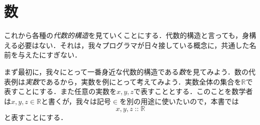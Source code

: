 \documentclass[twocolumn]{jsbook}
\newcommand{\keyword}[1]{{\emph{#1}}}
\DeclareMathOperator{\mathIn}{::}
\newcommand{\mathSpecialSet}[1]{\mathbb{#1}}
\begin{document}
\section{数}

これから各種の\keyword{代数的構造}を見ていくことにする．代数的構造と言っても，身構える必要はない．それは，我々プログラマが日々接している概念に，共通した名前を与えたにすぎない．

まず最初に，我々にとって一番身近な代数的構造である\keyword{数}を見てみよう．数の代表例は\keyword{実数}であるから，実数を例にとって考えてみよう．実数全体の集合を$\mathSpecialSet{R}$で表すことにする．また任意の実数を$x,y,z$で表すこととする．このことを数学者は$x,y,z\in\mathSpecialSet{R}$と書くが，我々は記号$\in$を別の用途に使いたいので，本書では$$x,y,z\mathIn\mathSpecialSet{R}$$と表すことにする．
\end{document}
